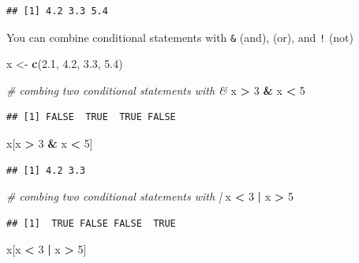 \documentclass[
]{book}
\newenvironment{Shaded}{\begin{snugshade}}{\end{snugshade}}
\newcommand{\CommentTok}[1]{\textcolor[rgb]{0.56,0.35,0.01}{\textit{#1}}}
\newcommand{\DecValTok}[1]{\textcolor[rgb]{0.00,0.00,0.81}{#1}}
\newcommand{\FloatTok}[1]{\textcolor[rgb]{0.00,0.00,0.81}{#1}}
\newcommand{\FunctionTok}[1]{\textcolor[rgb]{0.13,0.29,0.53}{\textbf{#1}}}
\newcommand{\NormalTok}[1]{#1}
\newcommand{\OtherTok}[1]{\textcolor[rgb]{0.56,0.35,0.01}{#1}}
\newcommand{\SpecialCharTok}[1]{\textcolor[rgb]{0.81,0.36,0.00}{\textbf{#1}}}
\begin{document}
\begin{verbatim}
## [1] 4.2 3.3 5.4
\end{verbatim}

You can combine conditional statements with \texttt{\&} (and), \texttt{\textbar{}} (or), and \texttt{!} (not)

\begin{Shaded}
\begin{Highlighting}[]
\NormalTok{x }\OtherTok{\textless{}{-}} \FunctionTok{c}\NormalTok{(}\FloatTok{2.1}\NormalTok{, }\FloatTok{4.2}\NormalTok{, }\FloatTok{3.3}\NormalTok{, }\FloatTok{5.4}\NormalTok{)}

\CommentTok{\# combing two conditional statements with \&}
\NormalTok{x }\SpecialCharTok{\textgreater{}} \DecValTok{3} \SpecialCharTok{\&}\NormalTok{ x }\SpecialCharTok{\textless{}} \DecValTok{5}
\end{Highlighting}
\end{Shaded}

\begin{verbatim}
## [1] FALSE  TRUE  TRUE FALSE
\end{verbatim}

\begin{Shaded}
\begin{Highlighting}[]
\NormalTok{x[x }\SpecialCharTok{\textgreater{}} \DecValTok{3} \SpecialCharTok{\&}\NormalTok{ x }\SpecialCharTok{\textless{}} \DecValTok{5}\NormalTok{]}
\end{Highlighting}
\end{Shaded}

\begin{verbatim}
## [1] 4.2 3.3
\end{verbatim}

\begin{Shaded}
\begin{Highlighting}[]
\CommentTok{\# combing two conditional statements with |}
\NormalTok{x }\SpecialCharTok{\textless{}} \DecValTok{3} \SpecialCharTok{|}\NormalTok{ x }\SpecialCharTok{\textgreater{}} \DecValTok{5}
\end{Highlighting}
\end{Shaded}

\begin{verbatim}
## [1]  TRUE FALSE FALSE  TRUE
\end{verbatim}

\begin{Shaded}
\begin{Highlighting}[]
\NormalTok{x[x }\SpecialCharTok{\textless{}} \DecValTok{3} \SpecialCharTok{|}\NormalTok{ x }\SpecialCharTok{\textgreater{}} \DecValTok{5}\NormalTok{]}
\end{Highlighting}
\end{Shaded}
\end{document}
